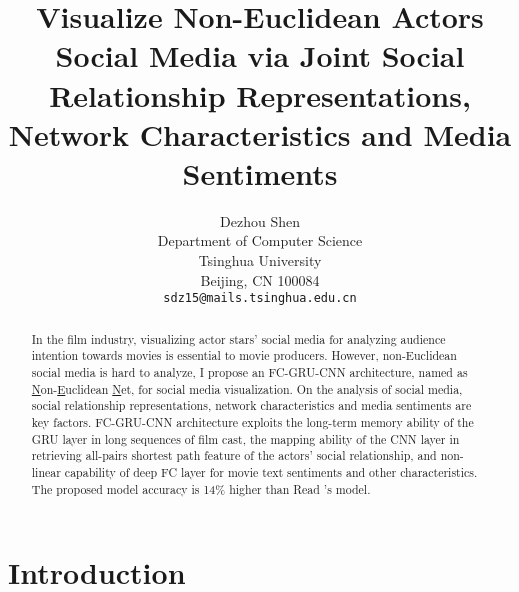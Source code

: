 \documentclass[review]{cvpr}
\begin{document}
\title{Visualize Non-Euclidean Actors Social Media via Joint Social Relationship Representations, Network Characteristics and Media Sentiments}

\author{Dezhou Shen\\
Department of Computer Science\\
Tsinghua University\\
Beijing, CN 100084\\
{\tt\small sdz15@mails.tsinghua.edu.cn}
}

\maketitle


\begin{abstract}

  In the film industry, visualizing actor stars' social media for analyzing audience intention towards movies is essential to movie producers.
  However, non-Euclidean social media is hard to analyze, I propose an FC-GRU-CNN architecture, named as \underline{N}on-\underline{E}uclidean \underline{N}et, for social media visualization.
  On the analysis of social media, social relationship representations, network characteristics and media sentiments are key factors.
  FC-GRU-CNN architecture exploits the long-term memory ability of the GRU layer in long sequences of film cast,
  the mapping ability of the CNN layer in retrieving all-pairs shortest path feature of the actors' social relationship,
  and non-linear capability of deep FC layer for movie text sentiments and other characteristics.
  The proposed model accuracy is 14\% higher than Read \etal's model.

\end{abstract}

\section{Introduction}
\end{document}
